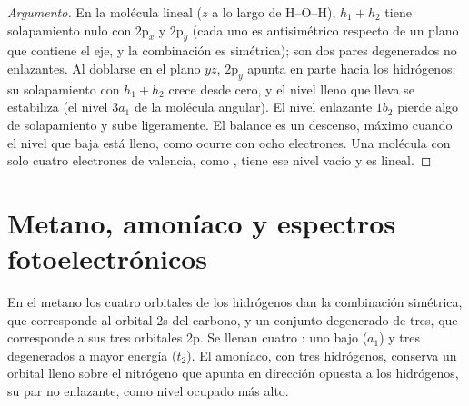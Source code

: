 \begin{proof}[Argumento]
En la molécula lineal ($z$ a lo largo de H--O--H), $h_1 + h_2$ tiene solapamiento nulo con
$2\mathrm p_x$ y $2\mathrm p_y$ (cada uno es antisimétrico respecto de un plano
que contiene el eje, y la combinación es simétrica); son dos pares degenerados
no enlazantes. Al doblarse en el plano $yz$, $2\mathrm p_y$ apunta en parte hacia
los hidrógenos: su solapamiento con $h_1 + h_2$ crece desde cero, y el nivel lleno
que lleva se estabiliza (el nivel $3a_1$ de la molécula angular). El nivel enlazante
$1b_2$ pierde algo de solapamiento y sube ligeramente. El balance es un descenso,
máximo cuando el nivel que baja está lleno, como ocurre con ocho electrones. Una
molécula con solo cuatro electrones de valencia, como , tiene ese nivel
vacío y es lineal.
\end{proof}

\section{Metano, amoníaco y espectros fotoelectrónicos}

En el metano los cuatro orbitales de los hidrógenos dan la combinación simétrica, que
corresponde al orbital 2s del carbono, y un conjunto degenerado de tres, que corresponde a
sus tres orbitales 2p. Se llenan cuatro : uno bajo ($a_1$) y tres
degenerados a mayor energía ($t_2$). El amoníaco, con tres hidrógenos, conserva un
orbital lleno sobre el nitrógeno que apunta en dirección opuesta a los hidrógenos, su par no enlazante, como
nivel ocupado más alto.

